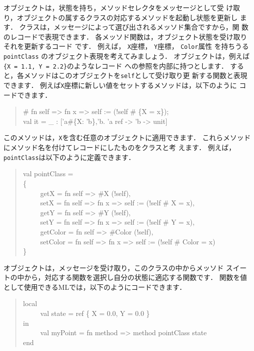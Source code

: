 \documentclass{jbook}
\newcommand{\myem}{\ \ \ \ \  }
\begin{document}
	オブジェクトは，状態を持ち，メソッドセレクタをメッセージとして受
け取り，オブジェクトの属するクラスの対応するメソッドを起動し状態を更新し
ます．
	クラスは，メッセージによって選び出されるメッソド集合ですから，関
数のレコードで表現できます．
	各メッソド関数は，オブジェクト状態を受け取りそれを更新するコード
です．
	例えば，
{\tt X}座標，
{\tt Y}座標，
{\tt Color}属性
を持ちうる
{\tt pointClass}
のオブジェクト表現を考えてみましょう．
	オブジェクトは，例えば{\tt \{X = 1.1, Y = 2.2\}}のようなレコード
への参照を内部に持つとします．
	すると，各メソッドはこのオブジェクトを{\tt self}として受け取り更
新する関数と表現できます．
	例えば{\tt X}座標に新しい値をセットするメソッドは，以下のように
コードできます．
\begin{tt}
\begin{quote}
\# fn self => fn x => self := (!self \# \{X = x\});\\
val it = \_ : ['a\#\{X: 'b\},'b. 'a ref -> 'b -> unit]
\end{quote}
\end{tt}
	このメソッドは，{\tt X}を含む任意のオブジェクトに適用できます．
	これらメソッドにメソッド名を付けてレコードにしたものをクラスと考
えます．
	例えば，{\tt pointClass}は以下のように定義できます．
\begin{tt}
\begin{quote}
val pointClass =\\
\{\\
\myem  getX = fn self => \#X (!self),\\
\myem  setX = fn self => fn x => self := (!self \# {X = x}),\\
\myem  getY = fn self => \#Y (!self),\\
\myem  setY = fn self => fn x => self := (!self \# {Y = x}),\\
\myem  getColor = fn self => \#Color (!self),\\
\myem  setColor = fn self => fn x => self := (!self \# {Color = x})\\
\}
\end{quote}
\end{tt}
	オブジェクトは，メッセージを受け取り，このクラスの中からメッソド
スイートの中から，対応する関数を選択し自分の状態に適応する関数です．
	関数を値として使用できるMLでは，以下のようにコードできます．
\begin{tt}
\begin{quote}
local\\
\myem  val state =  ref \{ X = 0.0, Y = 0.0 \}\\
in \\
\myem val myPoint = fn method => method pointClass state\\
end
\end{quote}
\end{tt}
\end{document}
